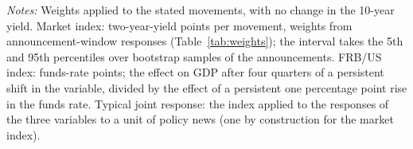 \begin{table}[tbp]\centering\small
\caption{Two Financial Movements that the Market Index Rates Alike}\label{tab:example}
\begin{flushleft}\footnotesize\textit{Notes:} Weights applied to the stated movements, with no change in the 10-year yield. Market index: two-year-yield points per movement, weights from announcement-window responses (Table~\ref{tab:weights}); the interval takes the 5th and 95th percentiles over bootstrap samples of the announcements. FRB/US index: funds-rate points; the effect on GDP after four quarters of a persistent shift in the variable, divided by the effect of a persistent one percentage point rise in the funds rate. Typical joint response: the index applied to the responses of the three variables to a unit of policy news (one by construction for the market index).\end{flushleft}
\end{table}

